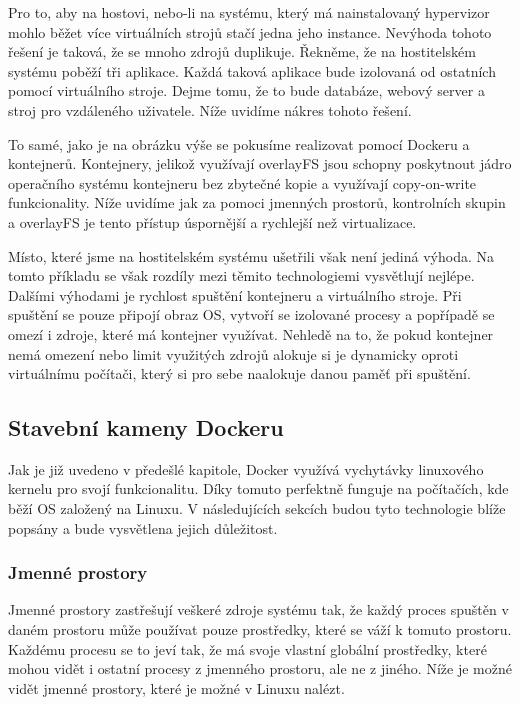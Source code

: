 Pro to, aby na hostovi, nebo-li na systému, který má nainstalovaný hypervizor mohlo běžet více virtuálních strojů stačí jedna jeho instance. Nevýhoda tohoto řešení je taková, že se mnoho zdrojů duplikuje. Řekněme, že na hostitelském systému poběží tři aplikace. Každá taková aplikace bude izolovaná od ostatních pomocí virtuálního stroje. Dejme tomu, že to bude databáze, webový server a stroj pro vzdáleného uživatele. Níže uvidíme nákres tohoto řešení. 



To samé, jako je na obrázku výše se pokusíme realizovat pomocí Dockeru a kontejnerů. Kontejnery, jelikož využívají overlayFS jsou schopny poskytnout jádro operačního systému kontejneru bez zbytečné kopie a využívají copy-on-write funkcionality. Níže uvidíme jak za pomoci jmenných prostorů, kontrolních skupin a overlayFS je tento přístup úspornější a rychlejší než virtualizace. 


Místo, které jsme na hostitelském systému ušetřili však není jediná výhoda. Na tomto příkladu se však rozdíly mezi těmito technologiemi vysvětlují nejlépe. Dalšími výhodami je rychlost spuštění kontejneru a virtuálního stroje. Při spuštění se pouze připojí obraz OS, vytvoří se izolované procesy a popřípadě se omezí i zdroje, které má kontejner využívat. Nehledě na to, že pokud kontejner nemá omezení nebo limit využitých zdrojů alokuje si je dynamicky oproti virtuálnímu počítači, který si pro sebe naalokuje danou paměť při spuštění.  


\subsection{Stavební kameny Dockeru}

Jak je již uvedeno v předešlé kapitole, Docker využívá vychytávky linuxového kernelu pro svojí funkcionalitu. Díky tomuto perfektně funguje na počítačích, kde běží OS založený na Linuxu. V následujících sekcích budou tyto technologie blíže popsány a bude vysvětlena jejich důležitost. 


\subsubsection{Jmenné prostory}

Jmenné prostory zastřešují veškeré zdroje systému tak, že každý proces spuštěn v daném prostoru může používat pouze prostředky, které se váží k tomuto prostoru. Každému procesu se to jeví tak, že má svoje vlastní globální prostředky, které mohou vidět i ostatní procesy z jmenného prostoru, ale ne z jiného. Níže je možné vidět jmenné prostory, které je možné v Linuxu nalézt.

